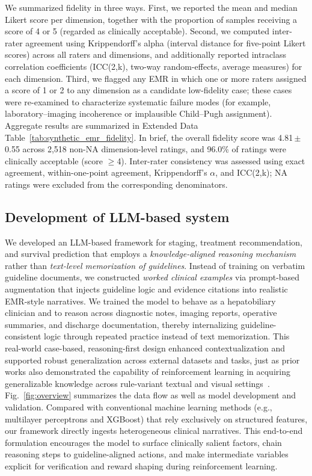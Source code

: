 \documentclass{article}
\begin{document}
We summarized fidelity in three ways. First, we reported the mean and median Likert score per dimension, together with the proportion of samples receiving a score of 4 or 5 (regarded as clinically acceptable). Second, we computed inter-rater agreement using Krippendorff's alpha (interval distance for five-point Likert scores) across all raters and dimensions, and additionally reported intraclass correlation coefficients (ICC(2,k), two-way random-effects, average measures) for each dimension. Third, we flagged any EMR in which one or more raters assigned a score of 1 or 2 to any dimension as a candidate low-fidelity case; these cases were re-examined to characterize systematic failure modes (for example, laboratory–imaging incoherence or implausible Child–Pugh assignment). Aggregate results are summarized in Extended Data Table~\ref{tab:synthetic_emr_fidelity}. In brief, the overall fidelity score was 4.81\,$\pm$\,0.55 across 2,518 non-NA dimension-level ratings, and 96.0\% of ratings were clinically acceptable (score $\geq$4). Inter-rater consistency was assessed using exact agreement, within-one-point agreement, Krippendorff's $\alpha$, and ICC(2,k); NA ratings were excluded from the corresponding denominators. 


\subsection{Development of LLM-based system}
We developed an LLM-based framework for staging, treatment recommendation, and survival prediction that employs a \emph{knowledge-aligned reasoning mechanism} rather than \emph{text-level memorization of guidelines}. Instead of training on verbatim guideline documents, we constructed \emph{worked clinical examples} via prompt-based augmentation that injects guideline logic and evidence citations into realistic EMR-style narratives. We trained the model to behave as a hepatobiliary clinician and to reason across diagnostic notes, imaging reports, operative summaries, and discharge documentation, thereby internalizing guideline-consistent logic through repeated practice instead of text memorization.
This real-world case-based, reasoning-first design enhanced contextualization and supported robust generalization across external datasets and tasks, just as prior works also demonstrated the capability of reinforcement learning in acquiring generalizable knowledge across rule-variant textual and visual settings~\cite{chu2025sft,xie2025logicrl}. Fig.~\ref{fig:overview} summarizes the data flow as well as model development and validation.
Compared with conventional machine learning methods (e.g., multilayer perceptrons and XGBoost) that rely exclusively on structured features, our framework directly ingests heterogeneous clinical narratives. This end-to-end formulation encourages the model to surface clinically salient factors, chain reasoning steps to guideline-aligned actions, and make intermediate variables explicit for verification and reward shaping during reinforcement learning.
\end{document}
